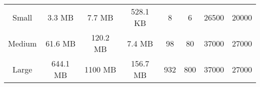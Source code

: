 \documentclass[letterpaper,twocolumn,10pt]{article}
\begin{document}
\begin{table}[h]
\begin{tabular}{|cccccccc|}
Small                      & 3.3 MB                                                                                 & 7.7 MB                                                                                         & 528.1 KB                                                                                 & 8                                                                                                    & 6                                                                                                     & 26500                                                                                          & 20000                                                                     \\
Medium                     & 61.6 MB                                                                                & 120.2 MB                                                                                       & 7.4 MB                                                                                   & 98                                                                                                   & 80                                                                                                    & 37000                                                                                          & 27000                                                                     \\
Large                      & 644.1 MB                                                                               & 1100 MB                                                                                        & 156.7 MB                                                                                 & 932                                                                                                  & 800                                                                                                   & 37000                                                                                          & 27000                                                                     \\ \hline
\end{tabular}
\end{table}

\end{document}
